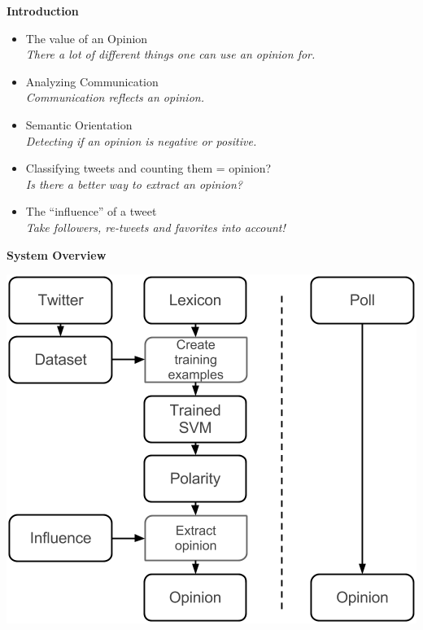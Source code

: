 \documentclass[landscape,20pt]{extarticle}
\newcommand*{\TitleFont}{\Huge \bf}
\newcommand*{\TextFont}{\normalsize \it}
\begin{document}
\thispagestyle{empty}
\Large
{\TitleFont Introduction}

\begin{itemize}
\item The value of an Opinion\\
{\TextFont There a lot of different things one can use an opinion for.}
\item Analyzing Communication\\
{\TextFont Communication reflects an opinion.}
\item Semantic Orientation\\
{\TextFont Detecting if an opinion is negative or positive.}
\item Classifying tweets and counting them = opinion?\\
{\TextFont Is there a better way to extract an opinion?}
\item The ``influence'' of a tweet\\
{\TextFont Take followers, re-tweets and favorites into account!}
\end{itemize}

\newpage
\thispagestyle{empty}
\mbox{}

\clearpage
\thispagestyle{empty}

{\TitleFont System Overview}
\vspace{0.4cm}
\begin{center}
\includegraphics[scale=1]{../img/Overview.png}
\end{center}
\end{document}
